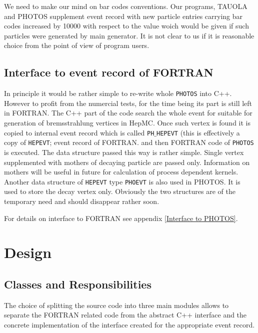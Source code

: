 \documentclass[]{Photos_interface_design}
\begin{document}
We need to make our mind on bar codes conventions. Our programs, TAUOLA and
 PHOTOS supplement event record with new particle entries carrying bar codes 
increased by 10000 with respect to the value woich would be given if such 
particles were generated by main generator. It is not clear to us if it is 
reasonable choice from the point of view of program users.

\subsection{Interface to event record of FORTRAN}
In principle it would be rather simple to re-write whole {\tt PHOTOS} into
C++. However to profit from the numercial tests, for the time being its part
is still left in FORTRAN. The C++ part of the code search the whole event for
suitable for generation of bremsstrahlung vertices in HepMC. Once such
vertex is found it is copied to internal event record  which is 
called  {\tt PH$\_$HEPEVT} (this is effectively a copy of {\tt HEPEVT};
 event record of FORTRAN.
and then FORTRAN code of {\tt PHOTOS} is executed.
The data structure passed this way is rather simple. Single vertex
supplemented with mothers of decaying particle are passed only. Information 
on mothers will be useful in future for calculation of process dependent 
kernels. Another data structure of   {\tt HEPEVT} type {\tt PHOEVT} is also 
used in PHOTOS. It is used to store the decay vertex only. Obviously 
the two structures are of the temporary need and should disappear rather soon.

For details on interface to FORTRAN see appendix \ref{Interface to PHOTOS}.


\section{Design}

\subsection{Classes and Responsibilities}

The choice of splitting the source code into three main modules
allows to separate the FORTRAN related code from the abstract C++ interface
and the concrete implementation of the interface created for the appropriate
event record.
\end{document}
